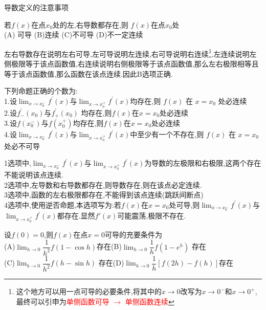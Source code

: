 \documentclass[8pt a4paper, oneside, UTF8]{ctexbook}  %
\begin{document}
\begin{sloppypar}
\begin{criterion}{导数定义的注意事项}{}
    \end{criterion}
    \begin{problem}
        若$f(x)$在点$x_{0}$处的左,右导数都存在,则 $f(x)$在点$x_{0}$处\\
        (A) 可导 \quad (B)连续 \quad  (C)不可导 \quad (D)不一定连续
    \end{problem}
    \begin{solution}
        左右导数存在说明左右可导,左可导说明左连续,右可导说明右连续\footnote{这个地方可以用一点可导的必要条件,将其中的$x \to 0$改写为$x \to 0^-$和$x \to 0^+$,最终可以引申为\textcolor{red}{单侧函数可导 $\to$ 单侧函数连续}}.左连续说明左侧极限等于该点函数值,右连续说明右侧极限等于该点函数值,那么左右极限相等且等于该点函数值,那么函数在该点连续.因此B选项正确.
    \end{solution}
    \begin{problem}
        下列命题正确的个数为:\\
        1.设$\lim_{x\to x_0^-}f^{\prime}(x)$与$\lim_{x\to x_0^+}f^{\prime}(x)$均存在,则 $f(x)$ 在 $x=x_0$ 处必连续\\
        2.设$f^{\prime}_-(x_{0})$与$f^{\prime}_{+}(x_{0})$ 均存在,则$f(x)$在$x=x_{0}$处必连续\\
        3.设$f(x_{0}^{-})$与$f(x_{0}^{+})$均存在,则$f(x)$在$x=x_{0}$处必连续\\
        4.设$\lim_{x\to x_{0}^{-}}f^{\prime}(x)$与$\lim_{x\to x_{0}^{+}}f^{\prime}(x)$中至少有一个不存在,则 $f(x)$ 在 $x=x_0$ 处必不可导
    \end{problem}
    \begin{solution}
        1选项中,$\lim_{x\to x_0^-}f^{\prime}(x)$与$\lim_{x\to x_0^+}f^{\prime}(x)$为导数的左极限和右极限,这两个存在不能说明该点连续.\\
        2选项中,左导数和右导数都存在,则导数存在,则在该点必定连续.\\
        3选项中,函数的左右极限都存在,不能得到该点连续(跳跃间断点)\\
        4选项中,使用逆否命题,本选项写为:若$f(x)$在$x=x_0$处可导,则$\lim_{x\to x_{0}^{-}}f^{\prime}(x)$与$\lim_{x\to x_{0}^{+}}f^{\prime}(x)$都存在.显然$f'(x)$可能震荡,极限不存在.
    \end{solution}
    \begin{problem}
        设$f(0)=0$,则$f(x)$在点$x=0$可导的充要条件为\\
        (A)$\lim_{h\to0}\dfrac{1}{h^{2}}f(1-\cos h)$存在\quad(B)$\lim_{h\to0}\dfrac{1}{h}f(1-e^h)$ 存在\\
        (C)$\lim_{h\to0}\dfrac1{h^2}f(h-\sin h)$ 存在\quad(D)$\lim_{h\to0}\dfrac{1}{h}[f(2h)-f(h)]$存在

\end{problem}
\end{sloppypar}
\end{document}
